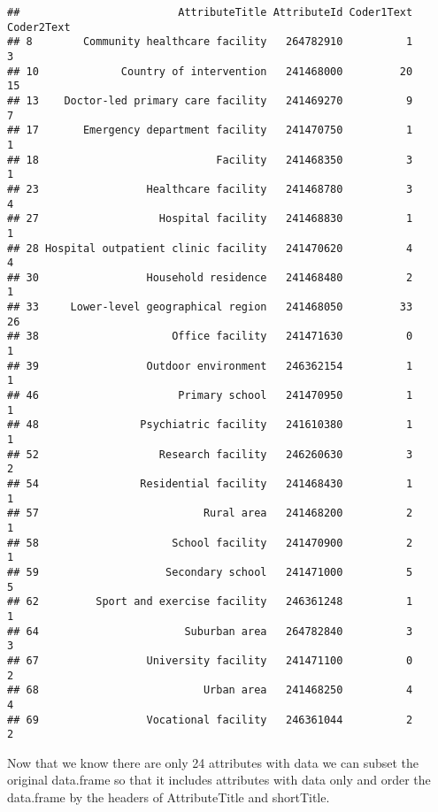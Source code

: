 \documentclass[]{article}
\newenvironment{Shaded}{\begin{snugshade}}{\end{snugshade}}
\newcommand{\KeywordTok}[1]{\textcolor[rgb]{0.13,0.29,0.53}{\textbf{#1}}}
\newcommand{\DataTypeTok}[1]{\textcolor[rgb]{0.13,0.29,0.53}{#1}}
\newcommand{\StringTok}[1]{\textcolor[rgb]{0.31,0.60,0.02}{#1}}
\newcommand{\OperatorTok}[1]{\textcolor[rgb]{0.81,0.36,0.00}{\textbf{#1}}}
\newcommand{\NormalTok}[1]{#1}
\begin{document}
\begin{verbatim}
##                         AttributeTitle AttributeId Coder1Text Coder2Text
## 8        Community healthcare facility   264782910          1          3
## 10             Country of intervention   241468000         20         15
## 13    Doctor-led primary care facility   241469270          9          7
## 17       Emergency department facility   241470750          1          1
## 18                            Facility   241468350          3          1
## 23                 Healthcare facility   241468780          3          4
## 27                   Hospital facility   241468830          1          1
## 28 Hospital outpatient clinic facility   241470620          4          4
## 30                 Household residence   241468480          2          1
## 33     Lower-level geographical region   241468050         33         26
## 38                     Office facility   241471630          0          1
## 39                 Outdoor environment   246362154          1          1
## 46                      Primary school   241470950          1          1
## 48                Psychiatric facility   241610380          1          1
## 52                   Research facility   246260630          3          2
## 54                Residential facility   241468430          1          1
## 57                          Rural area   241468200          2          1
## 58                     School facility   241470900          2          1
## 59                    Secondary school   241471000          5          5
## 62         Sport and exercise facility   246361248          1          1
## 64                       Suburban area   264782840          3          3
## 67                 University facility   241471100          0          2
## 68                          Urban area   241468250          4          4
## 69                 Vocational facility   246361044          2          2
\end{verbatim}

Now that we know there are only 24 attributes with data we can subset
the original data.frame so that it includes attributes with data only
and order the data.frame by the headers of AttributeTitle and
shortTitle.

\begin{Shaded}
\end{Shaded}
\end{document}
